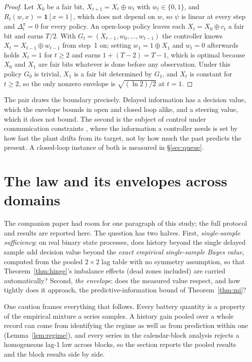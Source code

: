 \documentclass[acmsmall,screen,review,anonymous]{acmart}
\begin{document}
\begin{proof}
Let $X_0$ be a fair bit, $X_{t+1}=X_t\oplus w_t$ with $w_t\in\{0,1\}$, and
$R_t(w,x)=\mathbf 1[x=1]$, which does not depend on $w$, so
$\psi$ is linear at every step and $\Delta^\pi_t=0$ for every policy. An
open-loop policy leaves each $X_t=X_0\oplus c_t$ a fair bit and earns
$T/2$. With $G_t=(X_{t-1},w_0,\dots,w_{t-1})$ the controller knows
$X_t=X_{t-1}\oplus w_{t-1}$ from step~1 on; setting $w_1=1\oplus X_1$ and
$w_t=0$ afterwards holds $X_t=1$ for $t\ge2$ and earns $1+(T-2)=T-1$, which is
optimal because $X_0$ and $X_1$ are fair bits whatever is done before any
observation. Under this policy $G_0$ is trivial, $X_1$ is a fair bit
determined by $G_1$, and $X_t$ is constant for $t\ge2$, so the only
nonzero envelope is $\sqrt{(\ln 2)/2}$ at $t=1$.
\end{proof}

The pair draws the boundary precisely. Delayed information has a
decision value, which the envelope bounds in open and closed loop alike,
and a steering value, which it does not bound. The second is the subject
of control under communication constraints \cite{tatikondamitter04}, where
the information a controller needs is set by how fast the plant drifts
from its target, not by how much the past predicts the present. A
closed-loop instance of both is measured in \S\ref{sec:queue}.

\section{The law and its envelopes across domains}\label{sec:battery}

The companion paper had room for one paragraph of this study; the full
protocol and results are reported here. The question has two halves. First,
\emph{single-sample sufficiency}: on real binary state processes, does
history beyond the single delayed sample add decision value beyond the
\emph{exact empirical single-sample Bayes value}, computed from the
pooled $2{\times}2$ lag table with no symmetry assumption, so that
Theorem~\ref{thm:hinge}'s imbalance effects (dead zones included) are
carried automatically? Second, \emph{the envelope}: does the measured value
respect, and how tightly does it approach, the predictive-information bound
of Theorem~\ref{thm:mi}?

One caution frames everything that follows. Every battery quantity is a
property of the empirical mixture a series samples. A history gain pooled
over a whole record can come from identifying the regime as well as from
prediction within one (Lemma~\ref{lem:regime}), and every series in the
calendar-block analysis rejects a homogeneous lag-1 law across blocks, so the section reports the
pooled results and the block results side by side.
\end{document}
